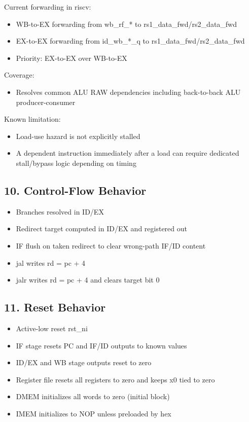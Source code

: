 \documentclass[]{article}
\providecommand{\tightlist}{%
  \setlength{\itemsep}{0pt}\setlength{\parskip}{0pt}}
\begin{document}
Current forwarding in riscv:

\begin{itemize}
\tightlist
\item
  WB-to-EX forwarding from wb\_rf\_* to rs1\_data\_fwd/rs2\_data\_fwd
\item
  EX-to-EX forwarding from id\_wb\_*\_q to rs1\_data\_fwd/rs2\_data\_fwd
\item
  Priority: EX-to-EX over WB-to-EX
\end{itemize}

Coverage:

\begin{itemize}
\tightlist
\item
  Resolves common ALU RAW dependencies including back-to-back ALU
  producer-consumer
\end{itemize}

Known limitation:

\begin{itemize}
\tightlist
\item
  Load-use hazard is not explicitly stalled
\item
  A dependent instruction immediately after a load can require dedicated
  stall/bypass logic depending on timing
\end{itemize}

\hypertarget{10-control-flow-behavior}{%
\subsection{10. Control-Flow Behavior}\label{10-control-flow-behavior}}

\begin{itemize}
\tightlist
\item
  Branches resolved in ID/EX
\item
  Redirect target computed in ID/EX and registered out
\item
  IF flush on taken redirect to clear wrong-path IF/ID content
\item
  jal writes rd = pc + 4
\item
  jalr writes rd = pc + 4 and clears target bit 0
\end{itemize}

\hypertarget{11-reset-behavior}{%
\subsection{11. Reset Behavior}\label{11-reset-behavior}}

\begin{itemize}
\tightlist
\item
  Active-low reset rst\_ni
\item
  IF stage resets PC and IF/ID outputs to known values
\item
  ID/EX and WB stage outputs reset to zero
\item
  Register file resets all registers to zero and keeps x0 tied to zero
\item
  DMEM initializes all words to zero (initial block)
\item
  IMEM initializes to NOP unless preloaded by hex
\end{itemize}
\end{document}
